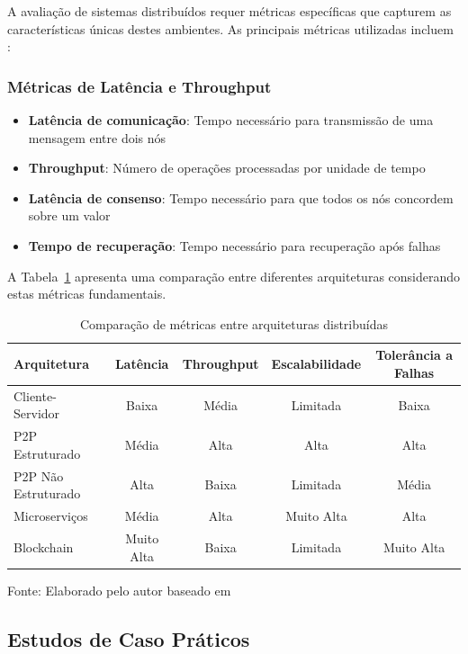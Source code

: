 A avaliação de sistemas distribuídos requer métricas específicas que capturem as características únicas destes ambientes. As principais métricas utilizadas incluem \cite{tanenbaum2016sistemas}:

\subsubsection{Métricas de Latência e Throughput}

\begin{itemize}
    \item \textbf{Latência de comunicação}: Tempo necessário para transmissão de uma mensagem entre dois nós
    \item \textbf{Throughput}: Número de operações processadas por unidade de tempo
    \item \textbf{Latência de consenso}: Tempo necessário para que todos os nós concordem sobre um valor
    \item \textbf{Tempo de recuperação}: Tempo necessário para recuperação após falhas
\end{itemize}

A Tabela~\ref{tab:metricas_comparacao} apresenta uma comparação entre diferentes arquiteturas considerando estas métricas fundamentais.

\begin{table}[H]
\centering
\caption{Comparação de métricas entre arquiteturas distribuídas}
\begin{tabular}{|l|c|c|c|c|}
\hline
\textbf{Arquitetura} & \textbf{Latência} & \textbf{Throughput} & \textbf{Escalabilidade} & \textbf{Tolerância a Falhas} \\
\hline
Cliente-Servidor & Baixa & Média & Limitada & Baixa \\
\hline
P2P Estruturado & Média & Alta & Alta & Alta \\
\hline
P2P Não Estruturado & Alta & Baixa & Limitada & Média \\
\hline
Microserviços & Média & Alta & Muito Alta & Alta \\
\hline
Blockchain & Muito Alta & Baixa & Limitada & Muito Alta \\
\hline
\end{tabular}
\label{tab:metricas_comparacao}
{\fontsize{10pt}{\baselineskip}\selectfont
Fonte: Elaborado pelo autor baseado em }
\end{table}

\subsection{Estudos de Caso Práticos}

